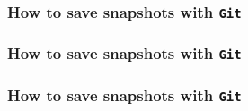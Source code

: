 \documentclass{beamer}
\begin{document}
\begin{frame}
\frametitle{How to save snapshots with \texttt{Git}}
\begin{center}
\end{center}
\end{frame}

\begin{frame}
\frametitle{How to save snapshots with \texttt{Git}}
\begin{center}
\end{center}
\end{frame}

\begin{frame}
\frametitle{How to save snapshots with \texttt{Git}}
\begin{center}
\end{center}
\end{frame}
\end{document}
